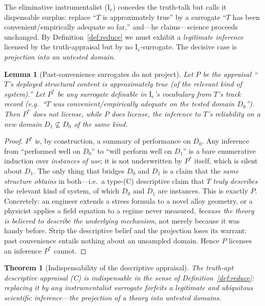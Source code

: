 \documentclass{amsart}
\theoremstyle{definition}
\theoremstyle{plain}
\newtheorem{lemma}{Lemma}
\newtheorem{theorem}{Theorem}
\begin{document}
The eliminative instrumentalist ($\mathrm I_e$) concedes the truth-talk but
calls it dispensable surplus: replace ``$T$ is approximately true'' by a
surrogate ``$T$ has been convenient/empirically adequate so far,'' and---he
claims---science proceeds unchanged. By Definition~\ref{def:reduce} we must
exhibit a \emph{legitimate inference} licensed by the truth-appraisal but by no
$\mathrm I_e$-surrogate. The decisive case is \emph{projection into an untested
domain}.

\begin{lemma}[Past-convenience surrogates do not project]\label{lem:noproject}
Let $P$ be the appraisal ``$T$'s deployed structural content is approximately
true (of the relevant kind of system).'' Let $P^{*}$ be any surrogate definable
in $\mathrm I_e$'s vocabulary from $T$'s track record (e.g.\ ``$T$ was
convenient/empirically adequate on the tested domain $D_0$''). Then $P^{*}$ does
not license, while $P$ does license, the inference to $T$'s reliability on a
\emph{new} domain $D_1\not\subseteq D_0$ of the same kind.
\end{lemma}

\begin{proof}
$P^{*}$ is, by construction, a summary of performance on $D_0$. Any inference
from ``performed well on $D_0$'' to ``will perform well on $D_1$'' is a bare
enumerative induction over \emph{instances of use}; it is not underwritten by
$P^{*}$ itself, which is silent about $D_1$. The only thing that bridges $D_0$
and $D_1$ is a claim that the \emph{same structure obtains} in both---i.e.\ a
type-(C) descriptive claim that $T$ \emph{truly describes} the relevant kind of
system, of which $D_0$ and $D_1$ are instances. This is exactly $P$. Concretely:
an engineer extends a stress formula to a novel alloy geometry, or a physicist
applies a field equation to a regime never measured, \emph{because the theory is
believed to describe the underlying mechanism}, not merely because it was handy
before. Strip the descriptive belief and the projection loses its warrant: past
convenience entails nothing about an unsampled domain. Hence $P$ licenses an
inference $P^{*}$ cannot.
\end{proof}

\begin{theorem}[Indispensability of the descriptive appraisal]\label{thm:indispensable}
The truth-apt descriptive appraisal (C) is \emph{indispensable} in the sense of
Definition~\ref{def:reduce}: replacing it by any instrumentalist surrogate
forfeits a legitimate and ubiquitous scientific inference---the projection of a
theory into untested domains.
\end{theorem}
\end{document}
